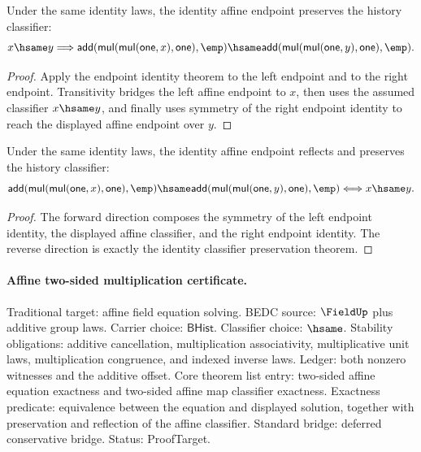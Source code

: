 \begin{theorem}
\label{thm:field-affine-identity-classifier}
Under the same identity laws, the identity affine endpoint preserves the
history classifier:
$$
x\hsame y
\Longrightarrow
\mathsf{add}(\mathsf{mul}(\mathsf{mul}(\mathsf{one},x),\mathsf{one}),\emp)
\hsame
\mathsf{add}(\mathsf{mul}(\mathsf{mul}(\mathsf{one},y),\mathsf{one}),\emp).
$$
\end{theorem}
\begin{proof}
Apply the endpoint identity theorem to the left endpoint and to the right
endpoint. Transitivity bridges the left affine endpoint to $x$, then uses the
assumed classifier $x\hsame y$, and finally uses symmetry of the right endpoint
identity to reach the displayed affine endpoint over $y$.
\end{proof}

\begin{theorem}
\label{thm:field-affine-identity-classifier-iff}
Under the same identity laws, the identity affine endpoint reflects and
preserves the history classifier:
$$
\mathsf{add}(\mathsf{mul}(\mathsf{mul}(\mathsf{one},x),\mathsf{one}),\emp)
\hsame
\mathsf{add}(\mathsf{mul}(\mathsf{mul}(\mathsf{one},y),\mathsf{one}),\emp)
\Longleftrightarrow
x\hsame y.
$$
\end{theorem}
\begin{proof}
The forward direction composes the symmetry of the left endpoint identity, the
displayed affine classifier, and the right endpoint identity. The reverse
direction is exactly the identity classifier preservation theorem.
\end{proof}

\paragraph{Affine two-sided multiplication certificate.}
Traditional target: affine field equation solving. BEDC source: $\FieldUp$ plus
additive group laws. Carrier choice: $\mathsf{BHist}$. Classifier choice:
$\hsame$. Stability obligations: additive cancellation, multiplication
associativity, multiplicative unit laws, multiplication congruence, and
indexed inverse laws. Ledger: both nonzero witnesses and the additive offset.
Core theorem list entry: two-sided affine equation exactness and two-sided
affine map classifier exactness. Exactness predicate: equivalence between the
equation and displayed solution, together with preservation and reflection of
the affine classifier. Standard bridge: deferred conservative bridge. Status:
ProofTarget.
